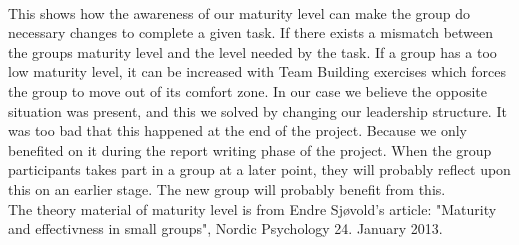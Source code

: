 \\
This shows how the awareness of our maturity level can make the group do necessary changes to complete a given task. If there exists a mismatch between the groups maturity level and the level needed by the task. If a group has a too low maturity level, it can be increased with Team Building exercises which forces the group to move out of its comfort zone. In our case we believe the opposite situation was present, and this we solved by changing our leadership structure. It was too bad that this happened at the end of the project. Because we only benefited on it during the report writing phase of the project. When the group participants takes part in a group at a later point, they will probably reflect upon this on an earlier stage. The new group will probably benefit from this.      
\\
The theory material of maturity level is from Endre Sjøvold's article: "Maturity and effectivness in small groups", Nordic Psychology 24. January 2013.  
